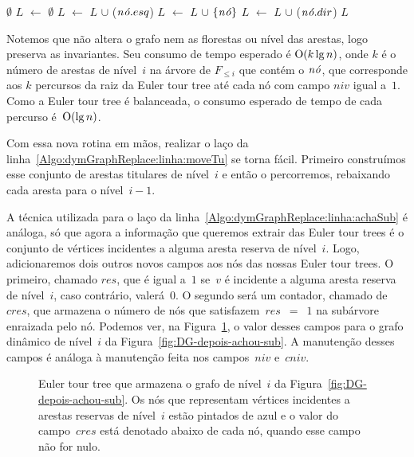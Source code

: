 \begin{algorithm}
\caption{\treapGetEdgesLevel($\node$)}
\label{Algo:treapGetEdgesLevel}
\begin{algorithmic}[1]
\State \Return $\emptyset$
\EndIf
\State $L$ $\gets$ $\emptyset$
\State  $L$ $\gets$ $L$ $\cup$ \treapGetEdgesLevel($\mathit{n\acute{o}}.esq$)
\EndIf
{}
\State $L$ $\gets$ $L$ $\cup$ $\{\mathit{n\acute{o}}\}$
\EndIf
{}
\State  $L$ $\gets$ $L$ $\cup$ \treapGetEdgesLevel($\mathit{n\acute{o}}.dir$)
\EndIf
\State \Return $L$
\end{algorithmic}
\end{algorithm}

Notemos que \treapGetEdgesLevel{} não altera o grafo nem as florestas ou nível das arestas, logo preserva as invariantes. Seu consumo de tempo esperado é $\mathrm{O}(k \lg n)$, onde $k$ é o número de arestas de nível~$i$ na árvore de $F_{\leqslant i}$ que contém o $\node$, que corresponde aos $k$ percursos da raiz da Euler tour tree até cada nó com campo $niv$ igual a~$1$. Como a Euler tour tree é balanceada, o consumo esperado de tempo de cada percurso é~$\mathrm{O}(\lg n)$.

Com essa nova rotina em mãos, realizar o laço da linha~\ref{Algo:dymGraphReplace:linha:moveTu} se torna fácil. Primeiro construímos esse conjunto de arestas titulares de nível~$i$ e então o percorremos, rebaixando cada aresta para o nível~$i-1$.

A técnica utilizada para o laço da linha~\ref{Algo:dymGraphReplace:linha:achaSub} é análoga,
só que agora a informação que queremos extrair das Euler tour trees é o conjunto de vértices incidentes a alguma aresta reserva de nível~$i$.
Logo, adicionaremos dois outros novos campos aos nós das nossas Euler tour trees.
O primeiro, chamado $res$, que é igual a~$1$ se~$v$ é incidente a alguma aresta reserva de nível~$i$, caso contrário, valerá~$0$.
O segundo será um contador, chamado de~$cres$, que armazena o número de nós que satisfazem~$res$~$=$~$1$ na subárvore enraizada pelo nó.
Podemos ver, na Figura~\ref{fig:DG-TREAP-res}, o valor desses campos para o grafo dinâmico de nível~$i$ da Figura~\ref{fig:DG-depois-achou-sub}.
A manutenção desses campos é análoga à manutenção feita nos campos~$niv$ e~$cniv$.

\begin{figure}[htb]
\scalebox{.61}{
\centering
}
\caption{Euler tour tree que armazena o grafo de nível~$i$ da Figura~\ref{fig:DG-depois-achou-sub}. Os nós que representam vértices incidentes a arestas reservas de nível~$i$ estão pintados de azul e o valor do campo~$cres$ está denotado abaixo de cada nó, quando esse campo não for nulo.}
\label{fig:DG-TREAP-res}
\end{figure}

